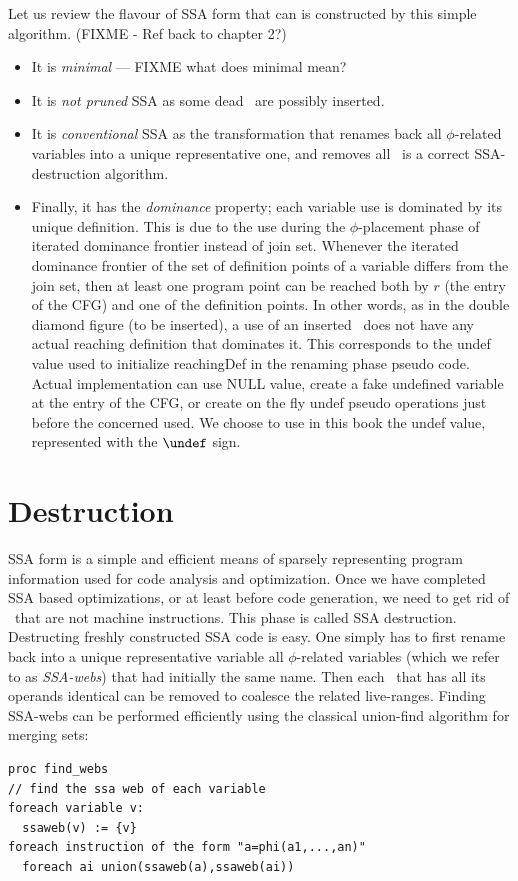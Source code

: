 Let us review the flavour of SSA form that can is constructed by this simple
algorithm. (FIXME - Ref back to chapter 2?)
\begin{itemize}
\item It is \textit{minimal} --- FIXME what does minimal mean? 
\item It is \textit{not pruned} SSA as some dead \phiops\ are possibly inserted.
\item It is \textit{conventional} SSA as the transformation that renames back all $\phi$-related variables into a unique representative one, and removes all \phiops\ is a correct SSA-destruction algorithm.
\item Finally, it has the \textit{dominance} property; each variable use is dominated by its unique definition. This is due to the use during the $\phi$-placement phase of iterated dominance frontier instead of join set. Whenever the iterated dominance frontier of the set of definition points of a variable differs from the join set, then at least one program point can be reached both by $r$ (the entry of the CFG) and one of the definition points. In other words, as in the double diamond figure (to be inserted), a use of an inserted \phiop\ does not have any actual reaching definition that dominates it. This corresponds to the undef value used to initialize reachingDef in the renaming phase pseudo code. Actual implementation can use NULL value, create a fake undefined variable at the entry of the CFG, or create on the fly undef pseudo operations just before the concerned used. We choose to use in this book the undef value, represented with the $\undef$ sign.
\end{itemize}


\section{Destruction }
\label{sec:classical_destruction}

SSA form is a simple and efficient means of
sparsely representing program information used for code analysis and optimization. Once we have completed SSA based optimizations, or at least before code generation, we need to get rid of \phiops\ that are not machine instructions. This phase is called SSA destruction. 
Destructing freshly constructed SSA code is easy. One simply has to first rename back into a unique representative variable all $\phi$-related variables (which we refer to as \textit{SSA-webs}) that had initially the same name. Then each \phiop\ that has all its operands identical can be removed to coalesce the related live-ranges.
Finding SSA-webs can be performed efficiently using the classical union-find algorithm for merging sets:
\begin{verbatim}
proc find_webs
// find the ssa web of each variable
foreach variable v:
  ssaweb(v) := {v}
foreach instruction of the form "a=phi(a1,...,an)"
  foreach ai union(ssaweb(a),ssaweb(ai))
\end{verbatim}

